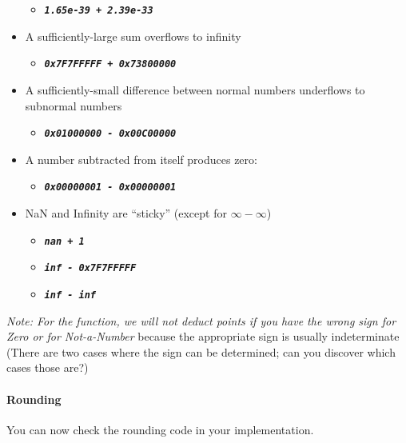 \begin{itemize}
\begin{itemize}
            \item[] \texttt{\textbf{\textit{1.65e-39 + 2.39e-33}}}
        \end{itemize}
        \item A sufficiently-large sum overflows to infinity
        \begin{itemize}
            \item[] \texttt{\textbf{\textit{0x7F7FFFFF + 0x73800000}}}
        \end{itemize}
        \item A sufficiently-small difference between normal numbers underflows to subnormal numbers
        \begin{itemize}
            \item[] \texttt{\textbf{\textit{0x01000000 - 0x00C00000}}}
        \end{itemize}
        \item A number subtracted from itself produces zero:
        \begin{itemize}
            \item[] \texttt{\textbf{\textit{0x00000001 - 0x00000001}}}
        \end{itemize}
        \item NaN and Infinity are ``sticky'' (except for $\infty - \infty$)
        \begin{itemize}
            \item[] \texttt{\textbf{\textit{nan + 1}}}
            \item[] \texttt{\textbf{\textit{inf - 0x7F7FFFFF}}}
            \item[] \texttt{\textbf{\textit{inf - inf}}}
        \end{itemize}
    \end{itemize}

    \textit{Note: For the  function, we will not deduct points if you have the wrong sign for Zero or for Not-a-Number} because the appropriate sign is usually indeterminate
    (There are two cases where the sign can be determined;
    can you discover which cases those are?)

    \paragraph*{Rounding}

    You can now check the rounding code in your  implementation.

